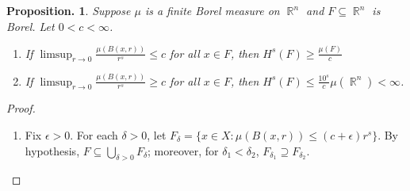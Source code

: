 \documentclass[11pt, a4paper]{memoir}
\DeclareMathOperator{\R}{{\mathbb{R}}}
\theoremstyle{change}
\newtheorem{proposition}[theorem]{Proposition.}
\theoremstyle{plain}
\theoremstyle{nonumberplain}
\newtheorem{proof}{Proof}
\numberwithin{equation}{section}
\begin{document}
\begin{proposition}
    Suppose $\mu$ is a finite Borel measure on $\R^n$ and $F\subseteq\R^n$ is Borel.
    Let $0<c<\infty$.
    \begin{enumerate}[nl,r]
        \item If $\limsup_{r\to 0}\frac{\mu(B(x,r))}{r^s}\leq c$ for all $x\in F$, then $H^s(F)\geq\frac{\mu(F)}{c}$
        \item If $\limsup_{r\to 0}\frac{\mu(B(x,r))}{r^s}\geq c$ for all $x\in F$, then $H^s(F)\leq\frac{10^s}{c}\mu(\R^n)<\infty$.
    \end{enumerate}
\end{proposition}
\begin{proof}
    \begin{enumerate}[nl,r]
        \item Fix $\epsilon>0$.
            For each $\delta>0$, let $F_\delta=\{x\in X:\mu(B(x,r))\leq(c+\epsilon)r^s\}$.
            By hypothesis, $F\subseteq\bigcup_{\delta>0}F_\delta$; moreover, for $\delta_1<\delta_2$, $F_{\delta_1}\supseteq F_{\delta_2}$.


\end{enumerate}
\end{proof}
\end{document}
